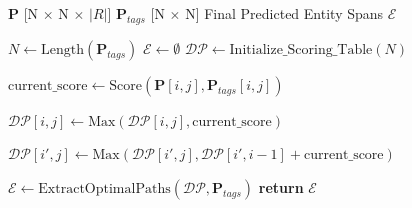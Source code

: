 \documentclass[12pt]{article}
\begin{document}
\begin{algorithm}
\caption{Module IV-B: Constrained DP Decoding}
\label{alg:module4b}
\begin{algorithmic}[1]
\REQUIRE $\mathbf{P}$ [N $\times$ N $\times$ $|R|$] 
\REQUIRE $\mathbf{P}_{tags}$ [N $\times$ N] 
\ENSURE Final Predicted Entity Spans $\mathcal{E}$

\vspace{0.5cm}
\STATE $N \leftarrow \text{Length}(\mathbf{P}_{tags})$
\STATE $\mathcal{E} \leftarrow \emptyset$ 
\STATE $\mathcal{DP} \leftarrow \text{Initialize\_Scoring\_Table}(N)$ 

        \STATE $\text{current\_score} \leftarrow \text{Score}(\mathbf{P}[i, j], \mathbf{P}_{tags}[i, j])$

            \STATE $\mathcal{DP}[i, j] \leftarrow \text{Max}(\mathcal{DP}[i, j], \text{current\_score})$
        \ENDIF

                \STATE $\mathcal{DP}[i', j] \leftarrow \text{Max}(\mathcal{DP}[i', j], \mathcal{DP}[i', i-1] + \text{current\_score})$
            \ENDFOR
        \ENDIF
    \ENDFOR
\ENDFOR

\STATE $\mathcal{E} \leftarrow \text{ExtractOptimalPaths}(\mathcal{DP}, \mathbf{P}_{tags})$ 
\STATE \textbf{return} $\mathcal{E}$
\end{algorithmic}
\end{algorithm}
\end{document}

